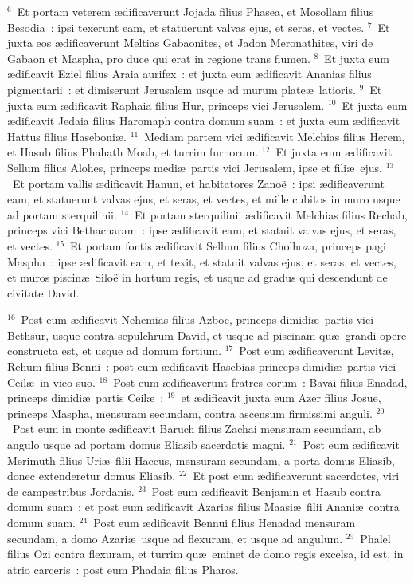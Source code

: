 ${}^{6}$~Et portam veterem \ae dificaverunt Jojada filius Phasea, et Mosollam filius Besodia~: ipsi texerunt eam, et statuerunt valvas ejus, et seras, et vectes.
${}^{7}$~Et juxta eos \ae dificaverunt Meltias Gabaonites, et Jadon Meronathites, viri de Gabaon et Maspha, pro duce qui erat in regione trans flumen.
${}^{8}$~Et juxta eum \ae dificavit Eziel filius Araia aurifex~: et juxta eum \ae dificavit Ananias filius pigmentarii~: et dimiserunt Jerusalem usque ad murum plate\ae\ latioris.
${}^{9}$~Et juxta eum \ae dificavit Raphaia filius Hur, princeps vici Jerusalem.
${}^{10}$~Et juxta eum \ae dificavit Jedaia filius Haromaph contra domum suam~: et juxta eum \ae dificavit Hattus filius Haseboni\ae .
${}^{11}$~Mediam partem vici \ae dificavit Melchias filius Herem, et Hasub filius Phahath Moab, et turrim furnorum.
${}^{12}$~Et juxta eum \ae dificavit Sellum filius Alohes, princeps medi\ae\ partis vici Jerusalem, ipse et fili\ae\ ejus.
${}^{13}$~Et portam vallis \ae dificavit Hanun, et habitatores Zano\"e~: ipsi \ae dificaverunt eam, et statuerunt valvas ejus, et seras, et vectes, et mille cubitos in muro usque ad portam sterquilinii.
${}^{14}$~Et portam sterquilinii \ae dificavit Melchias filius Rechab, princeps vici Bethacharam~: ipse \ae dificavit eam, et statuit valvas ejus, et seras, et vectes.
${}^{15}$~Et portam fontis \ae dificavit Sellum filius Cholhoza, princeps pagi Maspha~: ipse \ae dificavit eam, et texit, et statuit valvas ejus, et seras, et vectes, et muros piscin\ae\ Silo\"e in hortum regis, et usque ad gradus qui descendunt de civitate David.


${}^{16}$~Post eum \ae dificavit Nehemias filius Azboc, princeps dimidi\ae\ partis vici Bethsur, usque contra sepulchrum David, et usque ad piscinam qu\ae\ grandi opere constructa est, et usque ad domum fortium.
${}^{17}$~Post eum \ae dificaverunt Levit\ae , Rehum filius Benni~: post eum \ae dificavit Hasebias princeps dimidi\ae\ partis vici Ceil\ae\ in vico suo.
${}^{18}$~Post eum \ae dificaverunt fratres eorum~: Bavai filius Enadad, princeps dimidi\ae\ partis Ceil\ae~:
${}^{19}$~et \ae dificavit juxta eum Azer filius Josue, princeps Maspha, mensuram secundam, contra ascensum firmissimi anguli.
${}^{20}$~Post eum in monte \ae dificavit Baruch filius Zachai mensuram secundam, ab angulo usque ad portam domus Eliasib sacerdotis magni.
${}^{21}$~Post eum \ae dificavit Merimuth filius Uri\ae\ filii Haccus, mensuram secundam, a porta domus Eliasib, donec extenderetur domus Eliasib.
${}^{22}$~Et post eum \ae dificaverunt sacerdotes, viri de campestribus Jordanis.
${}^{23}$~Post eum \ae dificavit Benjamin et Hasub contra domum suam~: et post eum \ae dificavit Azarias filius Maasi\ae\ filii Anani\ae\ contra domum suam.
${}^{24}$~Post eum \ae dificavit Bennui filius Henadad mensuram secundam, a domo Azari\ae\ usque ad flexuram, et usque ad angulum.
${}^{25}$~Phalel filius Ozi contra flexuram, et turrim qu\ae\ eminet de domo regis excelsa, id est, in atrio carceris~: post eum Phadaia filius Pharos.


